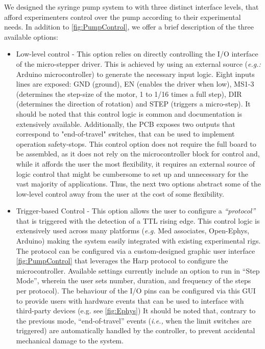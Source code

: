 We designed the syringe pump system to with three distinct interface levels, that afford experimenters control over the pump according to their experimental needs. In addition to \cref{fig:PumpControl}, we offer a brief description of the three available options:
\begin{itemize}

\item{Low-level control} - This option relies on directly controlling the I/O interface of the micro-stepper driver. This is achieved by using an external source (\textit{e.g.:} Arduino microcontroller) to generate the necessary input logic. Eight inputs lines are exposed: GND (ground), EN (enables the driver when low), MS1-3 (determines the step-size of the motor, 1 to 1/16 times a full step), DIR (determines the direction of rotation) and STEP (triggers a micro-step). It should be noted that this control logic is common and documentation is extensively available.
Additionally, the PCB exposes two outputs that correspond to "end-of-travel" switches, that can be used to implement operation safety-stops.
This control option does not require the full board to be assembled, as it does not rely on the microcontroller block for control and, while it affords the user the most flexibility, it requires an external source of logic control that might be cumbersome to set up and unnecessary for the vast majority of applications. Thus, the next two options abstract some of the low-level control away from the user at the cost of some flexibility.

\item{Trigger-based Control} - This option allows the user to configure a \textit{“protocol”} that is triggered with the detection of a TTL rising edge. This control logic is extensively used across many platforms (\textit{e.g.} Med associates, Open-Ephys, Arduino) making the system easily integrated with existing experimental rigs.
The protocol can be configured via a custom-designed graphic user interface \ref{fig:PumpControl} that leverages the Harp protocol to configure the microcontroller. Available settings currently include an option to run in “Step Mode”, wherein the user sets number, duration, and frequency of the steps per protocol). The behaviour of the I/O pins can be configured via this GUI to provide users with hardware events that can be used to interface with third-party devices (e.g. see \ref{fig:Ephys})
It should be noted that, contrary to the previous mode, “end-of-travel” events (\textit{i.e.,} when the limit switches are triggered) are automatically handled by the controller, to prevent accidental mechanical damage to the system.


\end{itemize}
